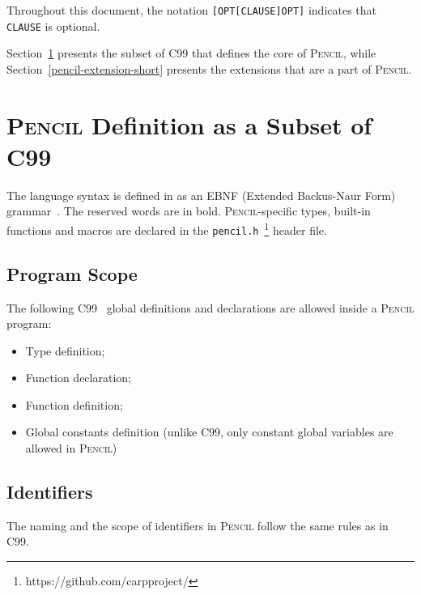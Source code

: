 \documentclass{carp}
\newcommand\pencil{\textsc{Pencil}\xspace}
\newcommand{\C}{C99\xspace}
\begin{document}
Throughout this document, the notation \lstinline![OPT[CLAUSE]OPT]! indicates
that \lstinline!CLAUSE! is optional.

Section~\ref{pencil-c99-subset} presents the subset of C99 that
defines the core of \pencil, while Section~\ref{pencil-extension-short}
presents the extensions that are a part of \pencil.

\section{\pencil Definition as a Subset of C99}
\label{pencil-c99-subset}
The language syntax is defined in  as an EBNF (Extended
Backus-Naur Form) grammar~\cite{wirth1996EBNF}.
The reserved words are in bold.
\pencil-specific types, built-in functions and macros are declared in
the \texttt{pencil.h}~\footnote{https://github.com/carpproject/}
header file.



\subsection{Program Scope}
The following \C~\cite{c99} global definitions and declarations are allowed inside a
\pencil program:
\begin{itemize}
  \item Type definition;
  \item Function declaration;
  \item Function definition;
  \item Global constants definition (unlike \C, only constant global variables
        are allowed in \pencil)
\end{itemize}

\subsection{Identifiers}
The naming and the scope of identifiers in \pencil follow the same rules as
in \C.
\end{document}
